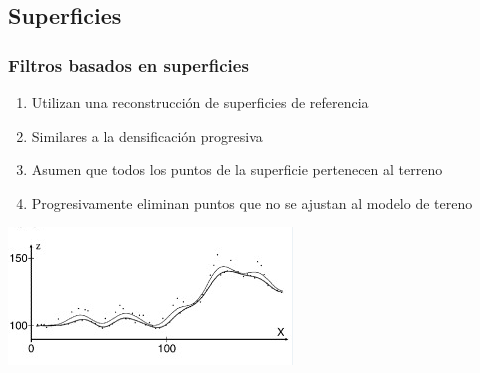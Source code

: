 \subsection{Superficies}
\begin{frame}
  \frametitle{Filtros basados en superficies}
  \begin{enumerate}
    \item Utilizan una reconstrucción de superficies de referencia
    \item Similares a la densificación progresiva
    \item Asumen que todos los puntos de la superficie pertenecen al terreno 
    \item Progresivamente eliminan puntos que no se ajustan al modelo de tereno
  \end{enumerate}
  \begin{center}
    \includegraphics[height=0.40\textheight]{images/surfbased_filter}
  \end{center}
\end{frame}
